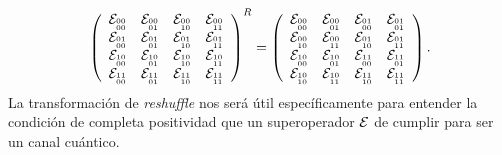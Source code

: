 \begin{align}
\left(
\begin{array}{cccc}
 \mathcal{E}_{{{}^{00}_{00}}} & \mathcal{E}_{{{}^{00}_{01}}} & \mathcal{E}_{{{}^{00}_{10}}} & \mathcal{E}_{{{}^{00}_{11}}} \\
 \mathcal{E}_{{{}^{01}_{00}}} & \mathcal{E}_{{{}^{01}_{01}}} & \mathcal{E}_{{{}^{01}_{10}}} & \mathcal{E}_{{{}^{01}_{11}}} \\
 \mathcal{E}_{{{}^{10}_{00}}} & \mathcal{E}_{{{}^{10}_{01}}} & \mathcal{E}_{{{}^{10}_{10}}} & \mathcal{E}_{{{}^{10}_{11}}} \\
 \mathcal{E}_{{{}^{11}_{00}}} & \mathcal{E}_{{{}^{11}_{01}}} & \mathcal{E}_{{{}^{11}_{10}}} & \mathcal{E}_{{{}^{11}_{11}}} \\
\end{array}
\right)^R
=
\left(
\begin{array}{cccc}
 \mathcal{E}_{{{}^{00}_{00}}} & \mathcal{E}_{{{}^{00}_{01}}} & \mathcal{E}_{{{}^{01}_{00}}} & \mathcal{E}_{{{}^{01}_{01}}} \\
 \mathcal{E}_{{{}^{00}_{10}}} & \mathcal{E}_{{{}^{00}_{11}}} & \mathcal{E}_{{{}^{01}_{10}}} & \mathcal{E}_{{{}^{01}_{11}}} \\
 \mathcal{E}_{{{}^{10}_{00}}} & \mathcal{E}_{{{}^{10}_{01}}} & \mathcal{E}_{{{}^{11}_{00}}} & \mathcal{E}_{{{}^{11}_{01}}} \\
 \mathcal{E}_{{{}^{10}_{10}}} & \mathcal{E}_{{{}^{10}_{11}}} & \mathcal{E}_{{{}^{11}_{10}}} & \mathcal{E}_{{{}^{11}_{11}}} \\
\end{array}
\right).
\end{align}
La transformación de \textit{reshuffle} nos será útil específicamente 
para entender la condición de completa positividad que un superoperador $\mathcal{E}$
de cumplir para ser un canal cuántico.


